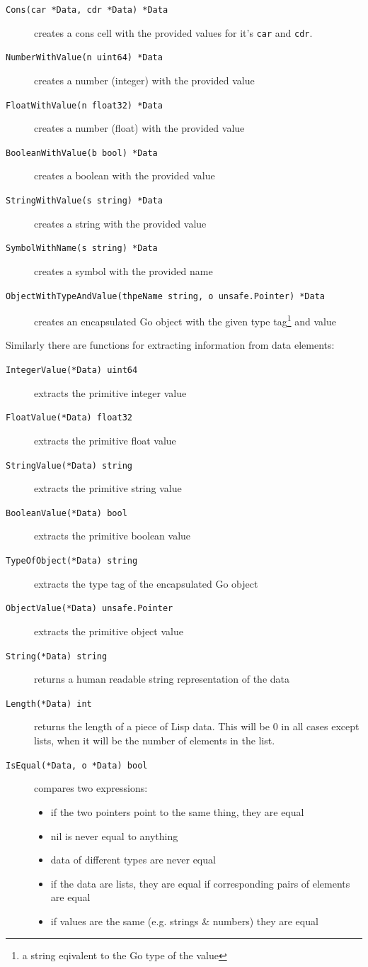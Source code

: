 \documentclass[12pt]{article}
\begin{document}
\begin{description}
\item [{\tt Cons(car *Data, cdr *Data) *Data}] creates a cons cell
  with the provided values for it's \verb|car| and \verb|cdr|.
\item [{\tt NumberWithValue(n uint64) *Data}] creates a number (integer)
  with the provided value
\item [{\tt FloatWithValue(n float32) *Data}] creates a number (float)
  with the provided value
\item [{\tt BooleanWithValue(b bool) *Data}] creates a boolean with
  the provided value
\item [{\tt StringWithValue(s string) *Data}] creates a string with
  the provided value
\item [{\tt SymbolWithName(s string) *Data}] creates a symbol with the
  provided name
\item [{\tt ObjectWithTypeAndValue(thpeName string, o unsafe.Pointer) *Data}]
  creates an encapsulated Go object with the given type tag\footnote{a
    string eqivalent to the Go type of the value} and value
\end{description}

\noindent Similarly there are functions for extracting information
from data elements:

\begin{description}
\item [{\tt IntegerValue(*Data) uint64}] extracts the primitive integer value
\item [{\tt FloatValue(*Data) float32}] extracts the primitive float value
\item [{\tt StringValue(*Data) string}] extracts the primitive
  string value
\item [{\tt BooleanValue(*Data) bool}] extracts the primitive
  boolean value
\item [{\tt TypeOfObject(*Data) string}] extracts the type tag of the
    encapsulated Go object
\item [{\tt ObjectValue(*Data) unsafe.Pointer}] extracts the
  primitive object value
\item [{\tt String(*Data) string}] returns a human readable string
  representation of the data
\item [{\tt Length(*Data) int}] returns the length of a piece of Lisp
  data. This will be 0 in all cases except lists, when it will be the
  number of elements in the list.
\item [{\tt IsEqual(*Data, o *Data) bool}] compares two expressions:
  \begin{itemize}
  \item if the two pointers point to the same thing, they are equal
  \item nil is never equal to anything
  \item data of different types are never equal
  \item if the data are lists, they are equal if corresponding pairs
    of elements are equal
  \item if values are the same (e.g. strings \& numbers) they are equal
  \end{itemize}
\end{description}
\end{document}
